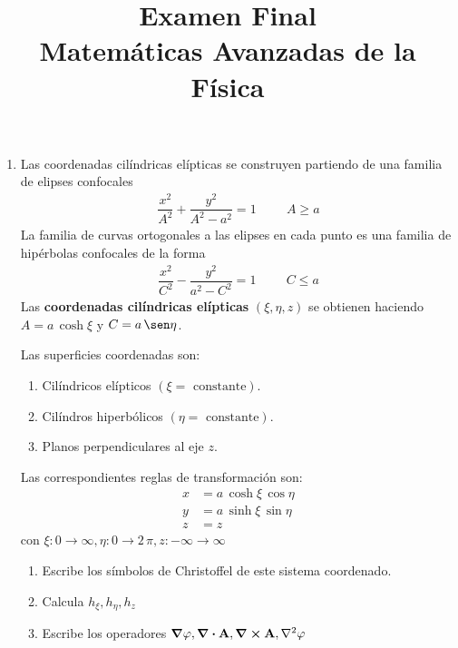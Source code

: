 
\author{}
\title{Examen Final \\ \large{Matemáticas Avanzadas de la Física} \vspace{-50pt}}
\date{}

\renewcommand\labelenumii{\theenumi.{\arabic{enumii})}}
\maketitle
\fontsize{14}{14}\selectfont
\begin{enumerate}
\item Las coordenadas cilíndricas elípticas se construyen partiendo de una familia de elipses confocales
\begin{align*}
\dfrac{x^{2}}{A^{2}} +  \dfrac{y^{2}}{A^{2} - a^{2}} =  1 \hspace{1cm} A \geq a
\end{align*}
La familia de curvas ortogonales a las elipses en cada punto es una familia de hipérbolas confocales de la forma
\begin{align*}
\dfrac{x^{2}}{C^{2}} - \dfrac{y^{2}}{a^{2} - C^{2}} = 1 \hspace{1cm} C \leq a
\end{align*}
Las \textbf{coordenadas cilíndricas elípticas} $(\xi, \eta, z)$ se obtienen haciendo $A = a \, \cosh \xi$ y $C = a \, \sen \eta$.
\par
Las superficies coordenadas son:
\begin{enumerate}[label=\alph*)]
\item Cilíndricos elípticos $(\xi = \mbox{ constante})$.
\item Cilíndros hiperbólicos $(\eta = \mbox{ constante})$.
\item Planos perpendiculares al eje $z$.
\end{enumerate}
Las correspondientes reglas de transformación son:
\begin{align*}
x &= a \, \cosh \xi \, \cos \eta \\
y &= a \, \sinh \xi \, \sin \eta \\
z &= z
\end{align*}
con $\xi: 0 \to \infty, \eta: 0 \to 2 \, \pi, z: -\infty \to \infty$
\begin{enumerate}
\item Escribe los símbolos de Christoffel de este sistema coordenado.
\item Calcula $h_{\xi}, h_{\eta}, h_{z}$
\item Escribe los operadores $\grad{\varphi}, \div{\vb{A}}, \curl \vb{A}, \laplacian{\varphi}$

\end{enumerate}
\end{enumerate}
